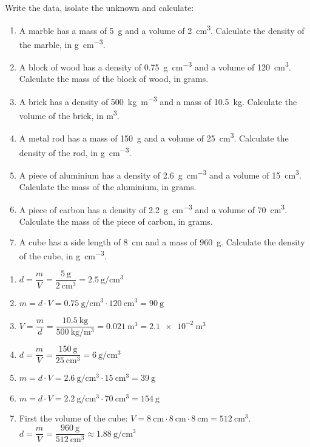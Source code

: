 \begin{exercise}
    Write the data, isolate the unknown and calculate:
    \begin{enumerate}[label=\letraminuscula]
        \item A marble has a mass of \qty{5}{\g} and a volume of \qty{2}{\cubic\cm}. Calculate the density of the marble, in \unit{\g\per\cubic\cm}.
        \item A block of wood has a density of \qty{0.75}{\g\per\cubic\cm} and a volume of \qty{120}{\cubic\cm}. Calculate the mass of the block of wood, in grams.
        \item A brick has a density of \qty{500}{\kg\per\cubic\m} and a mass of \qty{10.5}{\kg}. Calculate the volume of the brick, in \unit{\cubic\m}.
        \item A metal rod has a mass of \qty{150}{\g} and a volume of \qty{25}{\cubic\cm}. Calculate the density of the rod, in \unit{\g\per\cubic\cm}.
        \item A piece of aluminium has a density of \qty{2.6}{\g\per\cubic\cm} and a volume of \qty{15}{\cubic\cm}. Calculate the mass of the aluminium, in grams.
        \item A piece of carbon has a density of \qty{2.2}{\g\per\cubic\cm} and a volume of \qty{70}{\cubic\cm}. Calculate the mass of the piece of carbon, in grams.
        \item A cube has a side length of \qty{8}{\cm} and a mass of \qty{960}{\g}. Calculate the density of the cube, in \unit{\g\per\cubic\cm}.
    \end{enumerate}
    \begin{solu}
        \begin{enumerate}[label=\alph*)]
            \item \(d = \dfrac{m}{V} = \dfrac{\qty{5}{\g}}{\qty{2}{\cubic\cm}} = \qty{2.5}{\g\per\cubic\cm}\)
            \item \(m = d \cdot V = \qty{0.75}{\g\per\cubic\cm} \cdot \qty{120}{\cubic\cm} = \qty{90}{\g}\)
            \item \(V = \dfrac{m}{d} = \dfrac{\qty{10.5}{\kg}}{\qty{500}{\kg\per\cubic\m}} = \qty{0.021}{\cubic\m} = \qty{2.1e-2}{\cubic\m}\)
            \item \(d = \dfrac{m}{V} = \dfrac{\qty{150}{\g}}{\qty{25}{\cubic\cm}} = \qty{6}{\g\per\cubic\cm}\)
            \item \(m = d \cdot V = \qty{2.6}{\g\per\cubic\cm} \cdot \qty{15}{\cubic\cm} = \qty{39}{\g}\)
            \item \(m = d \cdot V = \qty{2.2}{\g\per\cubic\cm} \cdot \qty{70}{\cubic\cm} = \qty{154}{\g}\)
            \item First the volume of the cube: \(V = \qty{8}{\cm} \cdot \qty{8}{\cm} \cdot \qty{8}{\cm} = \qty{512}{\cubic\cm}\). \\
            \(d = \dfrac{m}{V} = \dfrac{\qty{960}{\g}}{\qty{512}{\cubic\cm}} \approx \qty{1.88}{\g\per\cubic\cm}\)
        \end{enumerate}
    \end{solu}
\end{exercise}



